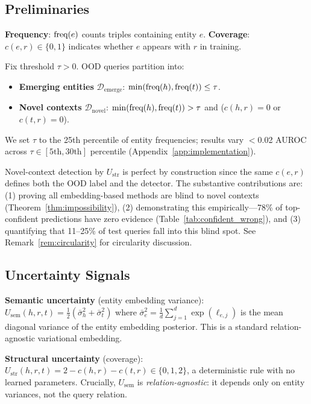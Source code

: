 
\subsection{Preliminaries}

\textbf{Frequency}: $\text{freq}(e)$ counts triples containing entity $e$.
\textbf{Coverage}: $c(e,r) \in \{0,1\}$ indicates whether $e$ appears with $r$ in training.

\begin{definition}
\label{def:ood}
Fix threshold $\tau > 0$. OOD queries partition into:
\begin{itemize}
\item \textbf{Emerging entities} $\mathcal{D}_{\text{emerge}}$: $\min(\text{freq}(h), \text{freq}(t)) \leq \tau$.
\item \textbf{Novel contexts} $\mathcal{D}_{\text{novel}}$: $\min(\text{freq}(h), \text{freq}(t)) > \tau$ and ($c(h,r)=0$ or $c(t,r)=0$).
\end{itemize}
We set $\tau$ to the 25th percentile of entity frequencies; results vary $<$0.02 AUROC across $\tau \in [5\text{th}, 30\text{th}]$ percentile (Appendix~\ref{app:implementation}).
\end{definition}

Novel-context detection by $U_{\text{str}}$ is perfect by construction since the same $c(e,r)$ defines both the OOD label and the detector. The substantive contributions are: (1) proving all embedding-based methods are blind to novel contexts (Theorem~\ref{thm:impossibility}), (2) demonstrating this empirically---78\% of top-confident predictions have zero evidence (Table~\ref{tab:confident_wrong}), and (3) quantifying that 11--25\% of test queries fall into this blind spot. See Remark~\ref{rem:circularity} for circularity discussion.

\subsection{Uncertainty Signals}

\textbf{Semantic uncertainty} (entity embedding variance): $U_{\text{sem}}(h,r,t) = \frac{1}{2}(\bar{\sigma}^2_h + \bar{\sigma}^2_t)$ where $\bar{\sigma}^2_e = \frac{1}{d}\sum_{j=1}^{d} \exp(\ell_{e,j})$ is the mean diagonal variance of the entity embedding posterior. This is a standard relation-agnostic variational embedding.

\textbf{Structural uncertainty} (coverage): $U_{\text{str}}(h,r,t) = 2 - c(h,r) - c(t,r) \in \{0, 1, 2\}$, a deterministic rule with no learned parameters. Crucially, $U_{\text{sem}}$ is \emph{relation-agnostic}: it depends only on entity variances, not the query relation.

